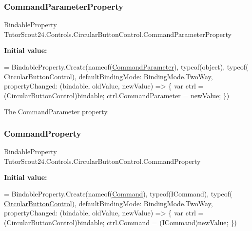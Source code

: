 \subsubsection{\texorpdfstring{Command\+Parameter\+Property}{CommandParameterProperty}}
{\footnotesize\ttfamily Bindable\+Property Tutor\+Scout24.\+Controls.\+Circular\+Button\+Control.\+Command\+Parameter\+Property\hspace{0.3cm}{\ttfamily [static]}}

{\bfseries Initial value\+:}
\begin{DoxyCode}
=
                BindableProperty.Create(nameof(\mbox{\hyperlink{class_tutor_scout24_1_1_controls_1_1_circular_button_control_a96e504109138c590d168abae62383dd2}{CommandParameter}}), typeof(\textcolor{keywordtype}{object}), typeof(
      \mbox{\hyperlink{class_tutor_scout24_1_1_controls_1_1_circular_button_control_a6c8ec4488cf7f6c670146060516a669f}{CircularButtonControl}}), defaultBindingMode: BindingMode.TwoWay,
                    propertyChanged: (bindable, oldValue, newValue) => \{
                        var ctrl = (CircularButtonControl)bindable;
                        ctrl.CommandParameter = newValue;
                    \})
\end{DoxyCode}


The Command\+Parameter property. 

\mbox{\label{class_tutor_scout24_1_1_controls_1_1_circular_button_control_a5ca42d339eb31dac2600ce8519027d69}} 
\subsubsection{\texorpdfstring{Command\+Property}{CommandProperty}}
{\footnotesize\ttfamily Bindable\+Property Tutor\+Scout24.\+Controls.\+Circular\+Button\+Control.\+Command\+Property\hspace{0.3cm}{\ttfamily [static]}}

{\bfseries Initial value\+:}
\begin{DoxyCode}
=
                BindableProperty.Create(nameof(\mbox{\hyperlink{class_tutor_scout24_1_1_controls_1_1_circular_button_control_ae661d29f62c71837ed9b347b9f654d55}{Command}}), typeof(ICommand), typeof(
      \mbox{\hyperlink{class_tutor_scout24_1_1_controls_1_1_circular_button_control_a6c8ec4488cf7f6c670146060516a669f}{CircularButtonControl}}), defaultBindingMode: BindingMode.TwoWay,
                    propertyChanged: (bindable, oldValue, newValue) => \{
                        var ctrl = (CircularButtonControl)bindable;
                        ctrl.Command = (ICommand)newValue;
                    \})
\end{DoxyCode}



